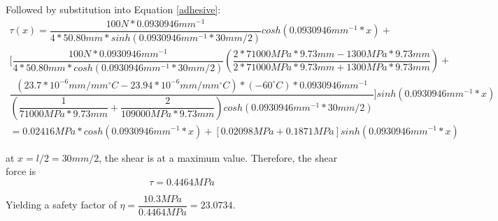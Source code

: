 \documentclass[../main.tex]{subfiles}
\begin{document}
Followed by substitution into Equation \ref{adhesive}:
\begin{multline} \label{adhesiveSolve}
\tau (x) = \dfrac{100N*0.0930946mm^{-1}}{4*50.80mm*sinh(0.0930946mm^{-1}* 30mm/2)}cosh(0.0930946mm^{-1}* x) + \\ \Bigg[\dfrac{100N*0.0930946mm^{-1}}{4*50.80mm*cosh(0.0930946mm^{-1}* 30mm/2)}\left(\dfrac{2*71000 MPa*9.73mm-1300MPa*9.73mm}{2*71000 MPa*9.73mm+1300MPa*9.73mm}\right)+ \\ \dfrac{(23.7*10^{-6}mm/mm^{\circ}C-23.94*10^{-6} mm/mm^{\circ}C)*(-60^{\circ}C)*0.0930946mm^{-1}}{\left(\dfrac{1}{71000MPa*9.73mm}+\dfrac{2}{109000 MPa*9.73mm}\right)cosh(0.0930946mm^{-1}* 30mm/2)}\Bigg] sinh(0.0930946mm^{-1}* x) \\ = 0.02416MPa*cosh(0.0930946mm^{-1}* x) + [0.02098MPa + 0.1871 MPa]sinh(0.0930946mm^{-1}* x)
\end{multline}

at $x = l/2 = 30mm/2$, the shear is at a maximum value. Therefore, the shear force is 
\begin{equation*}
	\tau = 0.4464 MPa
\end{equation*}

Yielding a safety factor of $\eta = \dfrac{10.3MPa}{0.4464MPa} = 23.0734$.
\end{document}
